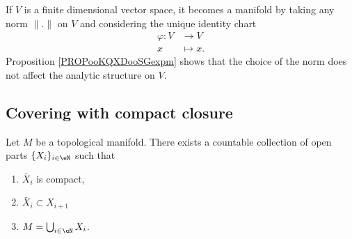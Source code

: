 \begin{definition}	\label{DEFooEQAWooPrHFEa}
	If \( V\) is a finite dimensional vector space, it becomes a manifold by taking any norm \( \| . \|\) on \( V\) and considering the unique identity chart
	\begin{equation}
		\begin{aligned}
			\varphi\colon V & \to V      \\
			x               & \mapsto x.
		\end{aligned}
	\end{equation}
	Proposition \ref{PROPooKQXDooSGexpm} shows that the choice of the norm does not affect the analytic structure on \( V\).
\end{definition}


\subsection{Covering with compact closure}

\begin{lemma}		\label{LEMooDHIHooQtAWUJ}
	Let \( M\) be a topological manifold. There exists a countable collection of open parts \( \{ X_i \}_{i\in \eN}\) such that
	\begin{enumerate}
		\item
		      \( \bar X_i\) is compact,
		\item
		      \( \bar X_i\subset X_{i+1}\)
		\item
		      \( M=\bigcup_{i\in \eN}X_i\).
	\end{enumerate}
\end{lemma}

